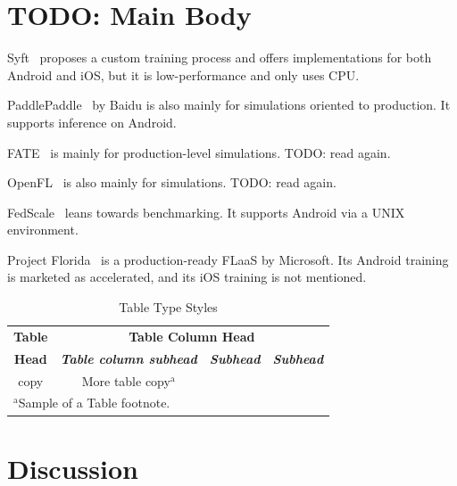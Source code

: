 \documentclass[conference]{IEEEtran}
\begin{document}
\section{TODO: Main Body}

Syft~\cite{ryffel2018generic,Ziller2021,hall2021syft}
proposes a custom training process and
offers implementations for both Android and iOS,
but it is low-performance and only uses CPU.

PaddlePaddle~\cite{ma2019paddlepaddle} by Baidu is
also mainly for simulations oriented to production.
It supports inference on Android.

FATE~\cite{liu2021fate} is mainly for production-level simulations.
TODO: read again.

OpenFL~\cite{patrick2022openfl} is also mainly for simulations.
TODO: read again.

FedScale~\cite{lai2022fedscale} leans towards benchmarking.
It supports Android via a UNIX environment.

Project Florida~\cite{madrigal2023project}
is a production-ready FLaaS by Microsoft.
Its Android training is marketed as accelerated,
and its iOS training is not mentioned.


\begin{table}[htbp]
\caption{Table Type Styles}
\begin{center}
\begin{tabular}{|c|c|c|c|}
\hline
\textbf{Table}&\multicolumn{3}{|c|}{\textbf{Table Column Head}} \\
\cline{2-4} 
\textbf{Head} & \textbf{\textit{Table column subhead}}& \textbf{\textit{Subhead}}& \textbf{\textit{Subhead}} \\
\hline
copy& More table copy$^{\mathrm{a}}$& &  \\
\hline
\multicolumn{4}{l}{$^{\mathrm{a}}$Sample of a Table footnote.}
\end{tabular}
\label{tab1}
\end{center}
\end{table}

\section{Discussion}

\end{document}

